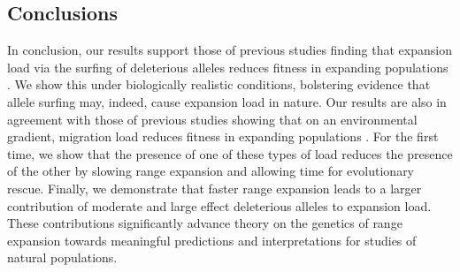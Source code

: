 \subsection{Conclusions}



In conclusion, our results support those of previous studies finding that expansion load via the surfing of deleterious alleles reduces fitness in expanding populations \citep{Peischl:2013, Peischl:2015, Peischl:2015b}. We show this under biologically realistic conditions, bolstering evidence that allele surfing may, indeed, cause expansion load in nature. Our results are also in agreement with those of previous studies showing that on an environmental gradient, migration load reduces fitness in expanding populations \citep{Kirkpatrick:1997, Bridle:2010, Polechova:2015}. For the first time, we show that the presence of one of these types of load reduces the presence of the other by slowing range expansion and allowing time for evolutionary rescue. Finally, we demonstrate that faster range expansion leads to a larger contribution of moderate and large effect deleterious alleles to expansion load. These contributions significantly advance theory on the genetics of range expansion towards meaningful predictions and interpretations for studies of natural populations. 

